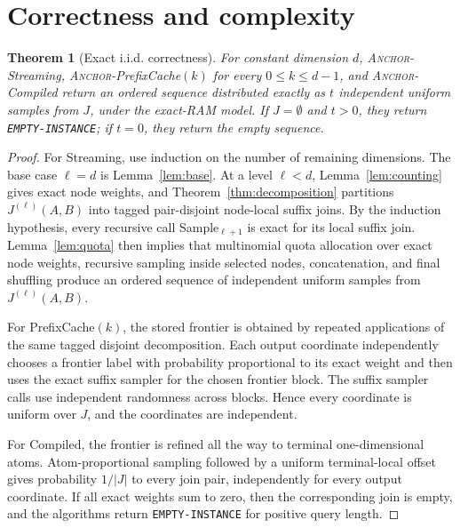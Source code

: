 \documentclass[11pt]{article}
\DeclareRobustCommand{\ANCHOR}{\textnormal{\textsc{Anchor}}}
\newcommand{\code}[1]{\texttt{#1}}
\newtheorem{theorem}{Theorem}[section]
\theoremstyle{definition}
\begin{document}
\section{Correctness and complexity}
\label{sec:guarantees}

\begin{theorem}[Exact i.i.d. correctness]
\label{thm:correctness}
For constant dimension $d$, \ANCHOR-Streaming, \ANCHOR-PrefixCache$(k)$ for every $0\le k\le d-1$, and \ANCHOR-Compiled return an ordered sequence distributed exactly as $t$ independent uniform samples from $J$, under the exact-RAM model.  If $J=\emptyset$ and $t>0$, they return \code{EMPTY-INSTANCE}; if $t=0$, they return the empty sequence.
\end{theorem}

\begin{proof}
For Streaming, use induction on the number of remaining dimensions.  The base case $\ell=d$ is Lemma~\ref{lem:base}.  At a level $\ell<d$, Lemma~\ref{lem:counting} gives exact node weights, and Theorem~\ref{thm:decomposition} partitions $J^{(\ell)}(A,B)$ into tagged pair-disjoint node-local suffix joins.  By the induction hypothesis, every recursive call Sample$_{\ell+1}$ is exact for its local suffix join.  Lemma~\ref{lem:quota} then implies that multinomial quota allocation over exact node weights, recursive sampling inside selected nodes, concatenation, and final shuffling produce an ordered sequence of independent uniform samples from $J^{(\ell)}(A,B)$.

For PrefixCache$(k)$, the stored frontier is obtained by repeated applications of the same tagged disjoint decomposition.  Each output coordinate independently chooses a frontier label with probability proportional to its exact weight and then uses the exact suffix sampler for the chosen frontier block.  The suffix sampler calls use independent randomness across blocks.  Hence every coordinate is uniform over $J$, and the coordinates are independent.

For Compiled, the frontier is refined all the way to terminal one-dimensional atoms.  Atom-proportional sampling followed by a uniform terminal-local offset gives probability $1/|J|$ to every join pair, independently for every output coordinate.  If all exact weights sum to zero, then the corresponding join is empty, and the algorithms return \code{EMPTY-INSTANCE} for positive query length.
\end{proof}
\end{document}
